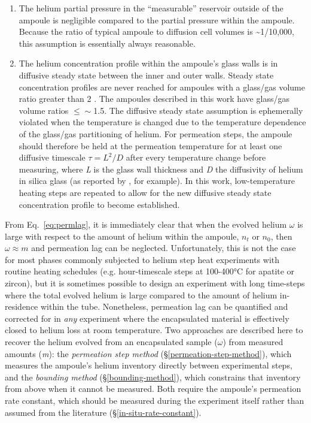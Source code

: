 \begin{enumerate}
\def\labelenumi{\arabic{enumi}.}
\item
  The helium partial pressure in the ``measurable'' reservoir outside of the ampoule is negligible compared to the partial pressure within the ampoule. Because the ratio of typical ampoule to diffusion cell volumes is \textasciitilde1/10,000, this assumption is essentially always reasonable.
\item
  The helium concentration profile within the ampoule's glass walls is in diffusive steady state between the inner and outer walls. Steady state concentration profiles are never reached for ampoules with a glass/gas volume ratio greater than 2 \citep{thyer2026thesis}. The ampoules described in this work have glass/gas volume ratios $\leq \sim$1.5. The diffusive steady state assumption is ephemerally violated when the temperature is changed due to the temperature dependence of the glass/gas partitioning of helium. For permeation steps, the ampoule should therefore be held at the permeation temperature for at least one diffusive timescale \(\tau = L^{2}/D\) after every temperature change before measuring, where \emph{L} is the glass wall thickness and \emph{D} the diffusivity of helium in silica glass (as reported by \citet{swets1961}, for example). In this work, low-temperature heating steps are repeated to allow for the new diffusive steady state concentration profile to become established.
\end{enumerate}

From Eq.~\eqref{eq:permlag}, it is immediately clear that when the evolved helium \(\omega\) is large with respect to the amount of helium within the ampoule, \(n_{t}\) or \(n_{0}\), then \(\omega \approx m\) and permeation lag can be neglected. Unfortunately, this is not the case for most phases commonly subjected to helium step heat experiments with routine heating schedules (e.g. hour-timescale steps at 100-400°C for apatite or zircon), but it is sometimes possible to design an experiment with long time-steps where the total evolved helium is large compared to the amount of helium in-residence within the tube. Nonetheless, permeation lag can be quantified and corrected for in \emph{any} experiment where the encapsulated material is effectively closed to helium loss at room temperature. Two approaches are described here to recover the helium evolved from an encapsulated sample (\(\omega\)) from measured amounts (\emph{m}): the \emph{permeation step method} (\S\ref{permeation-step-method}), which measures the ampoule's helium inventory directly between experimental steps, and the \emph{bounding method} (\S\ref{bounding-method}), which constrains that inventory from above when it cannot be measured. Both require the ampoule's permeation rate constant, which should be measured during the experiment itself rather than assumed from the literature (\S\ref{in-situ-rate-constant}).

